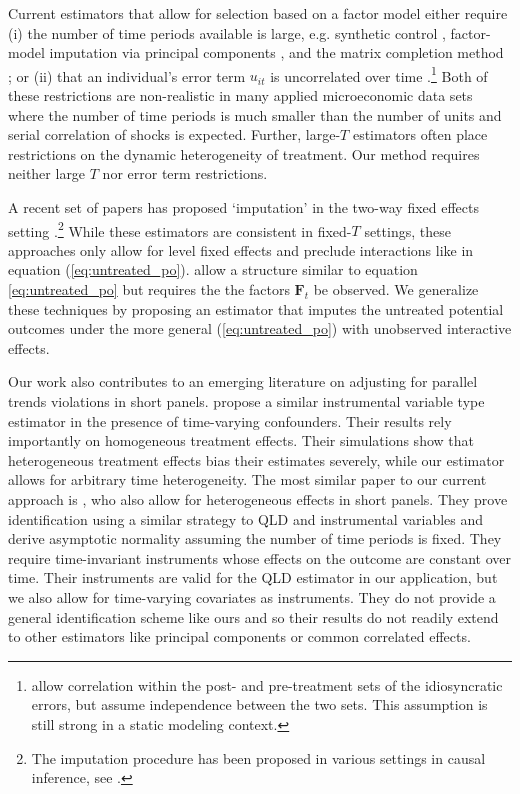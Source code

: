 \documentclass[12pt]{article}
\begin{document}
Current estimators that allow for selection based on a factor model either require (i) the number of time periods available is large, e.g. synthetic control \citep{abadie2021using}, factor-model imputation via principal components \citep{Gobillon_Magnac_2016,xu2017generalized,Bai_Ng_2021}, and the matrix completion method  \citep{Athey_et_al_2021,fernandez2021low}; or (ii) that an individual's error term $u_{it}$ is uncorrelated over time \citep{Feng_2020,Imbens_Kallus_Mao_2021}.\footnote{\citet{Imbens_Kallus_Mao_2021} allow correlation within the post- and pre-treatment sets of the idiosyncratic errors, but assume independence between the two sets. This assumption is still strong in a static modeling context.} Both of these restrictions are non-realistic in many applied microeconomic data sets where the number of time periods is much smaller than the number of units and serial correlation of shocks is expected. Further, large-$T$ estimators often place restrictions on the dynamic heterogeneity of treatment. Our method requires neither large $T$ nor error term restrictions.

A recent set of papers has proposed `imputation' in the two-way fixed effects setting \citep[e.g.][]{Borusyak_Jaravel_Spiess_2021,Gardner_2021,Wooldridge_2021}.\footnote{The imputation procedure has been proposed in various settings in causal inference, see \citet{imbens2015causal}.}
While these estimators are consistent in fixed-$T$ settings, these approaches only allow for level fixed effects and preclude interactions like in equation (\ref{eq:untreated_po}). \citet{Borusyak_Jaravel_Spiess_2021} allow a structure similar to equation \eqref{eq:untreated_po} but requires the the factors $\bm{F}_t$ be observed. We generalize these techniques by proposing an estimator that imputes the untreated potential outcomes under the more general (\ref{eq:untreated_po}) with unobserved interactive effects.

Our work also contributes to an emerging literature on adjusting for parallel trends violations in short panels. \citet{freyaldenhoven2019pre} propose a similar instrumental variable type estimator in the presence of time-varying confounders. Their results rely importantly on homogeneous treatment effects. Their simulations show that heterogeneous treatment effects bias their estimates severely, while our estimator allows for arbitrary time heterogeneity. The most similar paper to our current approach is \citet{Callaway_Karami_2020}, who also allow for heterogeneous effects in short panels. They prove identification using a similar strategy to QLD and instrumental variables and derive asymptotic normality assuming the number of time periods is fixed. They require time-invariant instruments whose effects on the outcome are constant over time. Their instruments are valid for the QLD estimator in our application, but we also allow for time-varying covariates as instruments. They do not provide a general identification scheme like ours and so their results do not readily extend to other estimators like principal components or common correlated effects.
\end{document}
